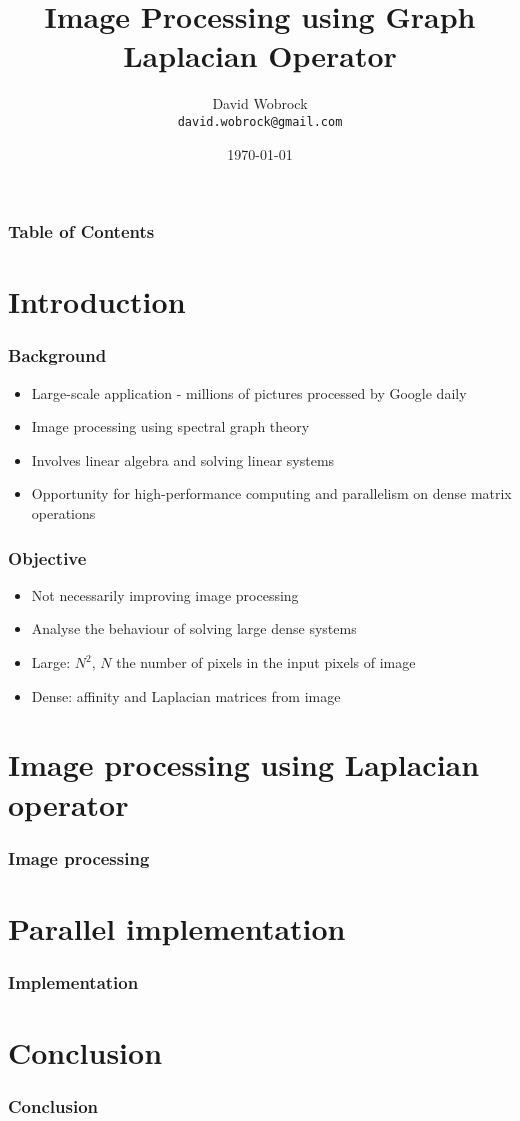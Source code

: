 \documentclass{beamer}
\title{Image Processing using Graph Laplacian Operator}
\author{David Wobrock \\ \texttt{david.wobrock@gmail.com}}
\institute{ALPINES Team - INRIA Paris \\ KTH, Stockholm \\ INSA, Lyon}
\date{\today}
\begin{document}
\frame{\titlepage}

\begin{frame}
 \frametitle{Table of Contents}
 \tableofcontents
\end{frame}

\section[Section]{Introduction}

\begin{frame}
 \frametitle{Background}
 \begin{itemize}
  \item Large-scale application - millions of pictures processed by Google daily
  \item Image processing using spectral graph theory
  \item Involves linear algebra and solving linear systems
  \item Opportunity for high-performance computing and parallelism on dense matrix operations
 \end{itemize}
\end{frame}

\begin{frame}
 \frametitle{Objective}
 \begin{itemize}
  \item Not necessarily improving image processing
  \item Analyse the behaviour of solving large dense systems
 \end{itemize}
 \begin{itemize}
  \item Large: \(N^2\), \(N\) the number of pixels in the input pixels of image
  \item Dense: affinity and Laplacian matrices from image
 \end{itemize}
\end{frame}

\section[Section]{Image processing using Laplacian operator}

\begin{frame}
 \frametitle{Image processing}
\end{frame}

\section[Section]{Parallel implementation}

\begin{frame}
 \frametitle{Implementation}
\end{frame}

\section[Section]{Conclusion}

\begin{frame}
 \frametitle{Conclusion}
\end{frame}
\end{document}
